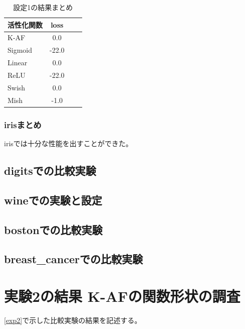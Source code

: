 \begin{table}[htbp]
    \begin{center}
        \caption{設定1の結果まとめ}
        \vspace{2mm} 
        \begin{tabular}{l*{2}{c}r}
            活性化関数              & loss \\
            \hline
            K-AF            & 0.0 \\
            Sigmoid            & -22.0 \\
            Linear            & 0.0 \\
            ReLU        & -22.0 \\
            Swish           & 0.0 \\
            Mish           & -1.0 \\
    
        \end{tabular}
    \end{center}
\end{table}


\subsubsection{irisまとめ}

irisでは十分な性能を出すことができた。


\subsection{digitsでの比較実験}
\label{ev:digitsでの比較実験}

\subsection{wineでの実験と設定}
\label{ev:wineでの実験と設定}

\subsection{bostonでの比較実験}
\label{ev:bostonでの比較実験}

\subsection{breast\_cancerでの比較実験}
\label{ev:breastcancer}

\section{実験2の結果 K-AFの関数形状の調査}
\label{evo2}
\ref{exp2}で示した比較実験の結果を記述する。


